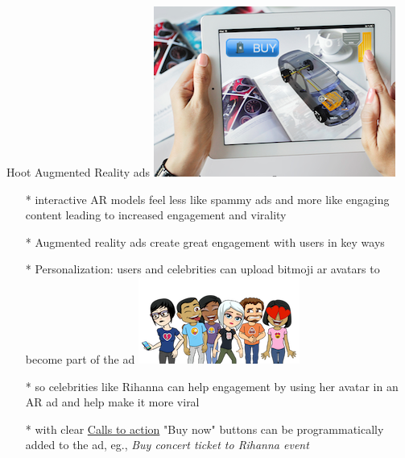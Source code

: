 \documentclass[12pt]{beamer}
\begin{document}
\begin{frame}[t]{Hoot Augmented Reality ads \includegraphics[scale=.1]{static/arad/arad5}} 
\begin{itemize}
\item[*]interactive AR models feel  less like spammy ads and more like engaging content leading to increased engagement and virality 
\pause	
\item[*]Augmented reality ads create great engagement with users in key ways
\pause
\item[*]Personalization: users and celebrities can upload bitmoji ar avatars to become part of the ad
\pause
\includegraphics[scale=.15]{static/arad/bitmoji} 
\pause
\item[*]so celebrities like Rihanna can help engagement by using her avatar in an AR ad and help make it more viral 
\pause
\item[*]with clear \underline{Calls to action} "Buy now" buttons can be programmatically added to the ad, eg., \emph{ Buy concert ticket to Rihanna event}
\end{itemize}
\end{frame}
\end{document}
